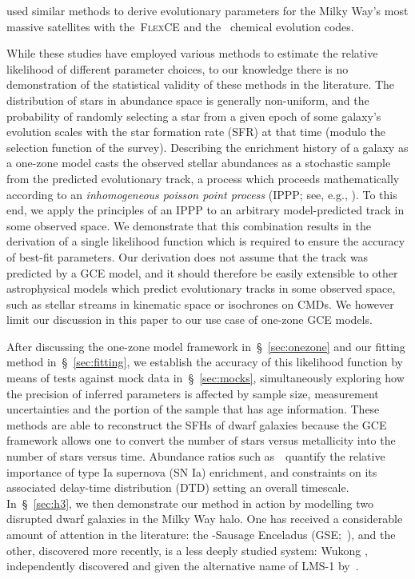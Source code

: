 \documentclass[ms.tex]{subfiles}
\begin{document}
\citet{Hasselquist2021} used similar methods to derive evolutionary parameters
for the Milky Way's most massive satellites with the~\textsc{FlexCE}
\citep{Andrews2017} and the~\citet{Lian2018, Lian2020} chemical evolution
codes.
\par
While these studies have employed various methods to estimate the relative
likelihood of different parameter choices, to our knowledge there is no
demonstration of the statistical validity of these methods in the literature.
The distribution of stars in abundance space is generally non-uniform, and the
probability of randomly selecting a star from a given epoch of some galaxy's
evolution scales with the star formation rate (SFR) at that time (modulo the
selection function of the survey).
Describing the enrichment history of a galaxy as a one-zone model casts the
observed stellar abundances as a stochastic sample from the predicted
evolutionary track, a process which proceeds mathematically according to an
\textit{inhomogeneous poisson point process} (IPPP; see, e.g.,
\citealt{Press2007}).
To this end, we apply the principles of an IPPP to an arbitrary model-predicted
track in some observed space.
We demonstrate that this combination results in the derivation of a single
likelihood function which is required to ensure the accuracy of best-fit
parameters.
Our derivation does not assume that the track was predicted by a GCE model,
and it should therefore be easily extensible to other astrophysical models
which predict evolutionary tracks in some observed space, such as stellar
streams in kinematic space or isochrones on CMDs.
We however limit our discussion in this paper to our use case of one-zone GCE
models.
\par
After discussing the one-zone model framework in~\S~\ref{sec:onezone} and
our fitting method in~\S~\ref{sec:fitting}, we establish the accuracy of this
likelihood function by means of tests against mock data in~\S~\ref{sec:mocks},
simultaneously exploring how the precision of inferred parameters is affected
by sample size, measurement uncertainties and the portion of the sample that
has age information.
These methods are able to reconstruct the SFHs of dwarf galaxies because the
GCE framework allows one to convert the number of stars versus metallicity into
the number of stars versus time.
Abundance ratios such as~\afe~quantify the relative importance of type Ia
supernova (SN Ia) enrichment, and constraints on its associated delay-time
distribution (DTD) setting an overall timescale.
In~\S~\ref{sec:h3}, we then demonstrate our method in action by modelling two
disrupted dwarf galaxies in the Milky Way halo.
One has received a considerable amount of attention in the literature: the
\gaia-Sausage Enceladus (GSE;~\citealp{Belokurov2018, Helmi2018}), and the
other, discovered more recently, is a less deeply studied system: Wukong
\citep{Naidu2020, Naidu2022}, independently discovered and given the
alternative name of LMS-1 by~\citet{Yuan2020}.
\end{document}
